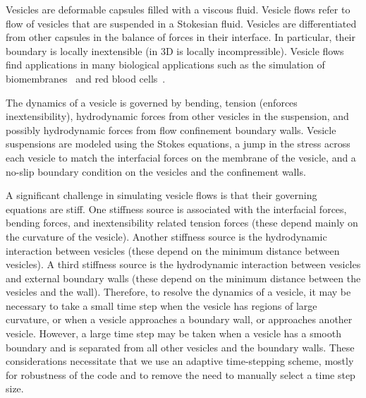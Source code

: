 Vesicles are deformable capsules filled with a viscous fluid. Vesicle
flows refer to flow of vesicles that are suspended in a Stokesian
fluid.  Vesicles are differentiated from other capsules in the balance
of forces in their interface.  In particular, their boundary is locally
inextensible (in 3D is locally incompressible).  Vesicle flows find
applications in many biological applications such as the simulation of
biomembranes~\cite{sac1996} and red blood
cells~\cite{ghi:rah:bir:mis2011, kao:tah:bib:ezz:ben:bir:mis2011,
mis2006, nog:gom2005,poz1990}.

The dynamics of a vesicle is governed by bending, tension (enforces
inextensibility), hydrodynamic forces from other vesicles in the
suspension, and possibly hydrodynamic forces from flow confinement
boundary walls.  Vesicle suspensions are modeled using the Stokes
equations, a jump in the stress across each vesicle to match the
interfacial forces on the membrane of the vesicle, and a no-slip
boundary condition on the vesicles and the confinement walls.

A significant challenge in simulating vesicle flows is that their
governing equations are stiff. One stiffness source is associated with
the interfacial forces, bending forces, and inextensibility related
tension forces (these depend mainly on the curvature of the vesicle).
Another stiffness source is the hydrodynamic interaction between
vesicles (these depend on the minimum distance between vesicles). A
third stiffness source is the hydrodynamic interaction between vesicles
and external boundary walls (these depend on the minimum distance
between the vesicles and the wall).  Therefore, to resolve the dynamics
of a vesicle, it may be necessary to take a small time step when the
vesicle has regions of large curvature, or when a vesicle approaches a
boundary wall, or approaches another vesicle. However, a large time
step may be taken when a vesicle has a smooth boundary and is separated
from all other vesicles and the boundary walls.  These considerations
necessitate that we use an adaptive time-stepping scheme, mostly for
robustness of the code and to remove the need to manually select a time
step size.

